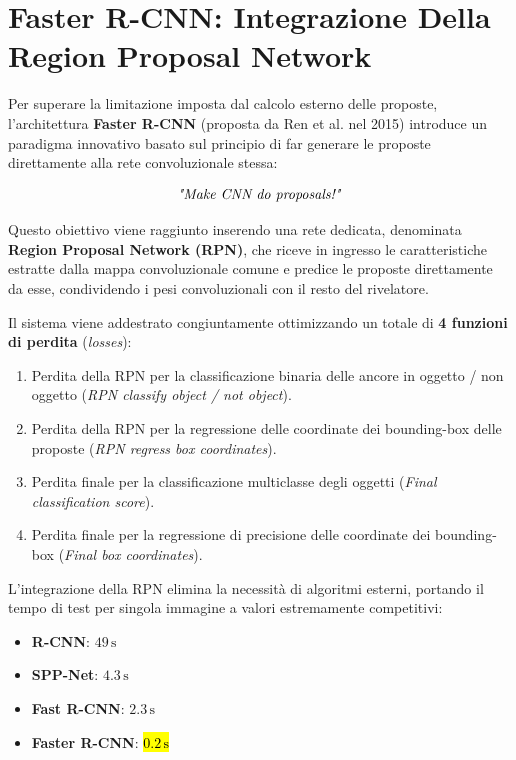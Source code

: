 ﻿\documentclass[11pt, a4paper]{article}
\begin{document}

\newpage

\section{Faster R-CNN: Integrazione Della Region Proposal Network}

Per superare la limitazione imposta dal calcolo esterno delle proposte, l'architettura \textbf{Faster R-CNN} (proposta da Ren et al. nel 2015) introduce un paradigma innovativo basato sul principio di far generare le proposte direttamente alla rete convoluzionale stessa:

\[
\text{\emph{"Make CNN do proposals!"}}
\]

Questo obiettivo viene raggiunto inserendo una rete dedicata, denominata \textbf{Region Proposal Network (RPN)}, che riceve in ingresso le caratteristiche estratte dalla mappa convoluzionale comune e predice le proposte direttamente da esse, condividendo i pesi convoluzionali con il resto del rivelatore.

Il sistema viene addestrato congiuntamente ottimizzando un totale di \textbf{4 funzioni di perdita} (\emph{losses}):
\begin{enumerate}
    \item Perdita della RPN per la classificazione binaria delle ancore in oggetto / non oggetto (\emph{RPN classify object / not object}).
    \item Perdita della RPN per la regressione delle coordinate dei bounding-box delle proposte (\emph{RPN regress box coordinates}).
    \item Perdita finale per la classificazione multiclasse degli oggetti (\emph{Final classification score}).
    \item Perdita finale per la regressione di precisione delle coordinate dei bounding-box (\emph{Final box coordinates}).
\end{enumerate}


L'integrazione della RPN elimina la necessità di algoritmi esterni, portando il tempo di test per singola immagine a valori estremamente competitivi:
\begin{itemize}
    \item \textbf{R-CNN}: $49\,\text{s}$
    \item \textbf{SPP-Net}: $4.3\,\text{s}$
    \item \textbf{Fast R-CNN}: $2.3\,\text{s}$
    \item \textbf{Faster R-CNN}: \hl{$0.2\,\text{s}$}
\end{itemize}
\end{document}
